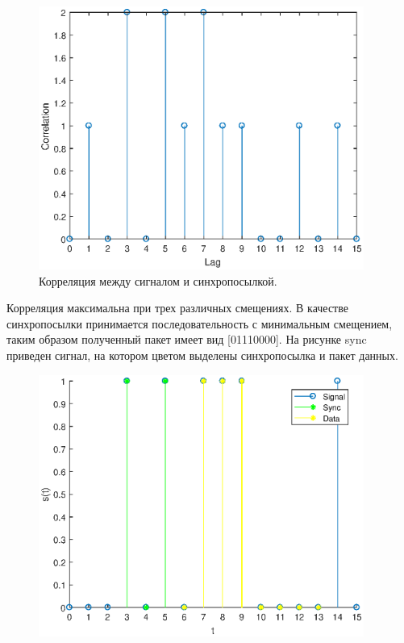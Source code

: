 \documentclass[a4paper,14pt]{extarticle}
\begin{document}
\begin{figure}[H]
\centering
\includegraphics[width=0.95\textwidth]{correl2.eps}
\captionsetup{justification=centering,margin=1cm}
\caption{Корреляция между сигналом и синхропосылкой.}
\label{correl2}
\end{figure}

Корреляция максимальна при трех различных смещениях. В качестве синхропосылки принимается последовательность с минимальным смещением, таким образом полученный пакет имеет вид [01110000]. На рисунке sync приведен сигнал, на котором цветом выделены синхропосылка и пакет данных.

\begin{figure}[H]
\centering
\includegraphics[width=0.95\textwidth]{sync.eps}
\captionsetup{justification=centering,margin=1cm}
\caption{ }
\label{sync}
\end{figure}
\end{document}
